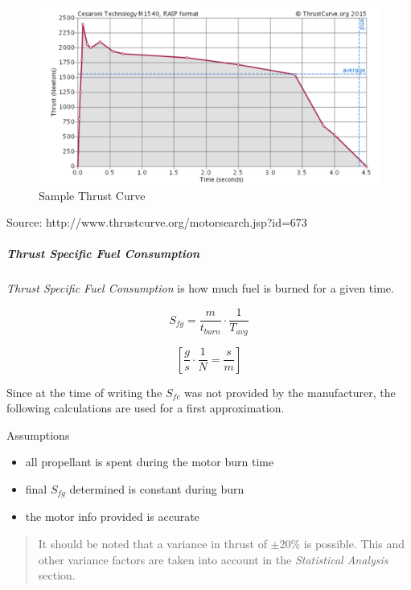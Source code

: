 \documentclass[]{article}
\providecommand{\tightlist}{%
  \setlength{\itemsep}{0pt}\setlength{\parskip}{0pt}}
\let\oldsubparagraph\subparagraph
\renewcommand{\subparagraph}[1]{\oldsubparagraph{#1}\mbox{}}
\begin{document}

\begin{figure}[htbp]
\centering
\includegraphics{images/M1540_thrust_curve.png}
\caption{Sample Thrust Curve\label{thrust_curve_label}}
\end{figure}

Source: http://www.thrustcurve.org/motorsearch.jsp?id=673

\subparagraph{Thrust Specific Fuel
Consumption}\label{thrust-specific-fuel-consumption}

\emph{Thrust Specific Fuel Consumption} is how much fuel is burned for a
given time.

\begin{equation}
S_{fg} = \dfrac{m}{t_{burn}}\cdot \dfrac{1}{T_{avg}}  
\end{equation}

\begin{equation}
\left[ \dfrac{g}{s}\cdot \dfrac{1}{N} = \dfrac{s}{m} \right]  
\end{equation}

Since at the time of writing the \(S_{fc}\) was not provided by the
manufacturer, the following calculations are used for a first
approximation.

Assumptions

\begin{itemize}
\tightlist
\item
  all propellant is spent during the motor burn time
\item
  final \(S_{fg}\) determined is constant during burn
\item
  the motor info provided is accurate
\end{itemize}

\begin{quote}
It should be noted that a variance in thrust of \(\pm 20 \%\) is
possible. This and other variance factors are taken into account in the
\emph{Statistical Analysis} section.
\end{quote}
\end{document}
